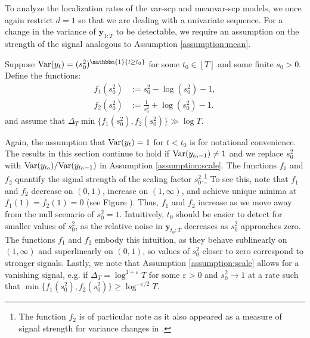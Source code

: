 To analyze the localization rates of the var-scp and meanvar-scp models, we once again restrict $d=1$ so that we are dealing with a univariate sequence. For a change in the variance of $\mathbf{y}_{1:T}$ to be detectable, we require an assumption on the strength of the signal analogous to Assumption \ref{assumption:mean}.
\begin{assumption}\label{assumption:scale}
    Suppose $\normalfont{\Var}(y_t) = (s_0^2)^{\mathbbm{1}\{t\geq t_0\}}$ for some $t_0 \in [T]$ and some finite $s_0 > 0$. Define the functions:
    \begin{align}
        f_1(s_0^2) &:= s_0^2 - \log (s_0^2) - 1, \label{eq:f1-signal-fn} \\
        f_2(s_0^2) &:= \frac{1}{s_0^2} + \log (s_0^2) - 1.\label{eq:f2-signal-fn}
    \end{align}
    and assume that $\Delta_T\min\{f_1(s_0^2),f_2(s_0^2)\} \gg \log T$. 
\end{assumption}
\vspace{-5pt}
Again, the assumption that $\text{\normalfont Var}(y_t) =1$ for $t < t_0$ is for notational convenience. The results in this section continue to hold if $\text{\normalfont Var}(y_{t_0-1}) \neq 1$ and we replace $s_0^2$ with $\text{\normalfont Var}(y_{t_0}) / \text{\normalfont Var}(y_{t_0-1})$ in Assumption \ref{assumption:scale}. The functions $f_1$ and $f_2$ quantify the signal strength of the scaling factor $s_0^2$.\footnote{The function $f_2$ is of particular note as it also appeared as a measure of signal strength for variance changes in \cite{Bai10}.} To see this, note that $f_1$ and $f_2$ decrease on $(0,1)$, increase on $(1,\infty)$, and achieve unique minima at $f_1(1) = f_2(1) = 0$ (see Figure ). Thus, $f_1$ and $f_2$ increase as we move away from the null scenario of $s_0^2 = 1$. Intuitively, $t_0$ should be easier to detect for smaller values of $s_0^2$, as the relative noise in $\mathbf{y}_{t_0:T}$ decreases as $s_0^2$ approaches zero. The functions $f_1$ and $f_2$ embody this intuition, as they behave sublinearly on $(1,\infty)$ and superlinearly on $(0,1)$, so values of $s_0^2$ closer to zero correspond to stronger signals. Lastly, we note that Assumption \ref{assumption:scale} allows for a vanishing signal, e.g. if $\Delta_T = \log^{1+\varepsilon} T$ for some $\varepsilon > 0$ and $s_0^2 \to 1$ at a rate such that $\min\{f_1(s_0^2),f_2(s_0^2)\} \geq \log^{-\varepsilon/2} T$.
 
